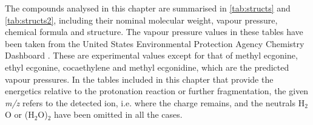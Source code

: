 The compounds analysed in this chapter are summarised in \autoref{tab:structs} and \autoref{tab:structs2}, including their nominal molecular weight, vapour pressure, chemical formula and structure.
%
The vapour pressure values in these tables have been taken from the United States Environmental Protection Agency Chemistry Dashboard \cite{USAEPA}. These are experimental values except for that of methyl ecgonine, ethyl ecgonine, cocaethylene and methyl ecgonidine, which are the predicted vapour pressures.
%
 In the tables included in this chapter that provide the energetics relative to the protonation reaction or further fragmentation, the given \textit{m/z} refers to the detected ion, i.e. where the charge remains, and the neutrals H$_2$O or (H$_2$O)$_2$ have been omitted in all the cases.





